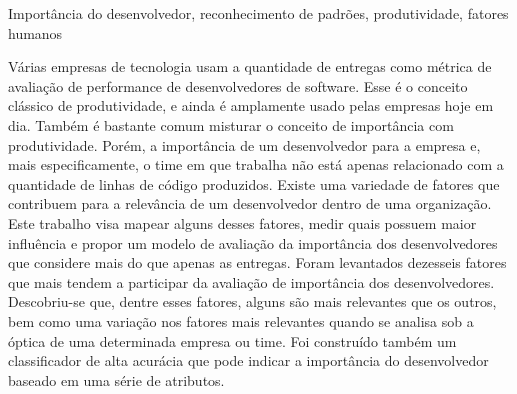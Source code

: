 \documentclass[dissertmst]{ppgco}
\begin{document}


\begin{resumo}{Importância do desenvolvedor, reconhecimento de padrões, produtividade, fatores humanos}

 	 Várias empresas de tecnologia usam a quantidade de entregas como métrica de avaliação de performance de desenvolvedores de software. Esse é o conceito clássico de produtividade, e ainda é amplamente usado pelas empresas hoje em dia. Também é bastante comum misturar o conceito de importância com produtividade. Porém, a importância de um desenvolvedor para a empresa e, mais especificamente, o time em que trabalha não está apenas relacionado com a quantidade de linhas de código produzidos. Existe uma variedade de fatores que contribuem para a relevância de um desenvolvedor dentro de uma organização. Este trabalho visa mapear alguns desses fatores, medir quais possuem maior influência e propor um modelo de avaliação da importância dos desenvolvedores que considere mais do que apenas as entregas. Foram levantados dezesseis fatores que mais tendem a participar da avaliação de importância dos desenvolvedores. Descobriu-se que, dentre esses fatores, alguns são mais relevantes que os outros, bem como uma variação nos fatores mais relevantes quando se analisa sob a óptica de uma determinada empresa ou time. Foi construído também um classificador de alta acurácia que pode indicar a importância do desenvolvedor baseado em uma série de atributos.
     
\end{resumo}
\end{document}
